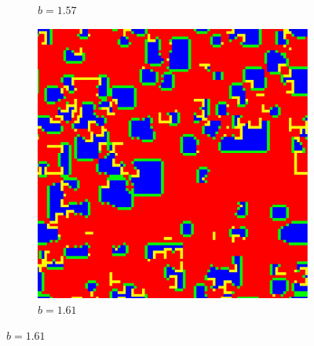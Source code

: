 \documentclass[12pt]{article}
\begin{document}
\begin{figure}[!htbp]
\begin{subfigure}{.33\textwidth}
            \caption{$b=1.57$}
            \label{fig:sub5}
            \end{subfigure}%
            \begin{subfigure}{.33\textwidth}
            \centering
            \includegraphics[width=.9\linewidth]{MeanFieldGame/snapshot_b=161.jpg}
            \caption{$b=1.61$}
            \label{fig:sub6}
            \end{subfigure}
            

\end{figure}
\end{document}
